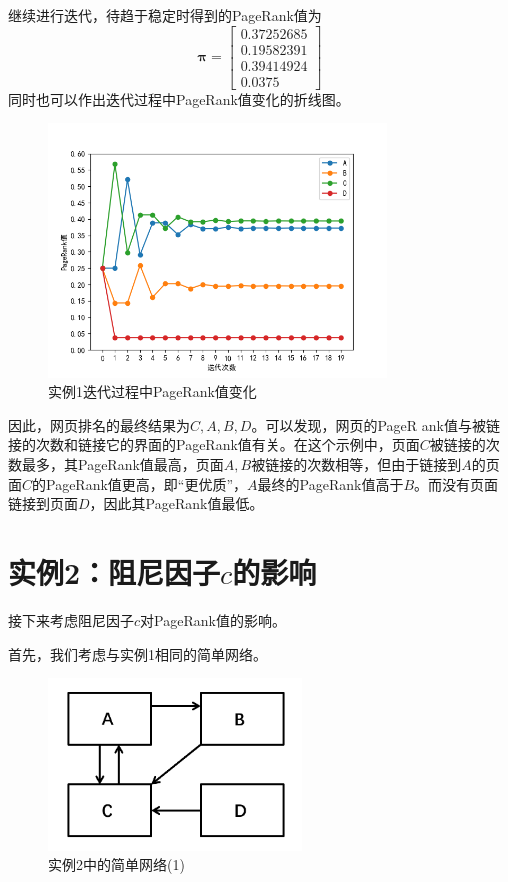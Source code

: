 \documentclass[UTF8,openany]{ctexbook}
\begin{document}
继续进行迭代，待趋于稳定时得到的PageRank值为
$$
    \boldsymbol{\pi}=\begin{bmatrix}
        0.37252685 \\0.19582391\\0.39414924\\0.0375
    \end{bmatrix}
$$
同时也可以作出迭代过程中PageRank值变化的折线图。
\begin{figure}[H]
    \begin{center}
        \includegraphics[width=0.80\textwidth]{images/Figure_1.png}
        \caption{实例1迭代过程中PageRank值变化}
    \end{center}
\end{figure}
因此，网页排名的最终结果为$C,A,B,D$。可以发现，网页的PageR ank值与被链接的次数和链接它的界面的PageRank值有关。在这个示例中，页面$C$被链接的次数最多，其PageRank值最高，页面$A,B$被链接的次数相等，但由于链接到$A$的页面$C$的PageRank值更高，即“更优质”，$A$最终的PageRank值高于$B$。而没有页面链接到页面$D$，因此其PageRank值最低。

\section[实例2：阻尼因子$c$的影响]{实例2：阻尼因子$c$的影响}

接下来考虑阻尼因子$c$对PageRank值的影响。

首先，我们考虑与实例1相同的简单网络。
\begin{figure}[H]
    \begin{center}
        \includegraphics[width=0.6\textwidth]{images/pic1.png}
        \caption{实例2中的简单网络(1)}
    \end{center}
\end{figure}
\end{document}
